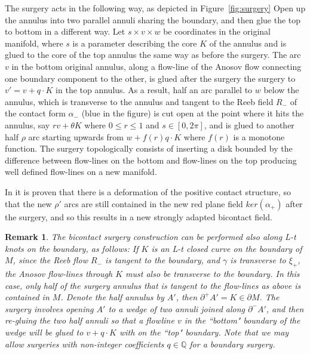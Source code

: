 \documentclass{amsart}
\newtheorem{remark}[theorem]{Remark}
\theoremstyle{definition}
\theoremstyle{remark}
\begin{document}
{
The surgery acts in the following way, as depicted in Figure~\ref{fig:surgery} Open up the annulus into two parallel annuli sharing the boundary, and then glue the top to bottom in a different way. Let $s\times v\times w$ be coordinates in the original manifold, where $s$ is a parameter describing the core $K$ of the annulus and is glued to the core of the top annulus the same way as before the surgery. The arc $v$ in the bottom original annulus, along a flow-line of the Anosov flow connecting one boundary component to the other, is glued after the surgery the surgery to $v'=v+q\cdot K$ in the top annulus. As a result, half an arc parallel to $w$ below the annulus, which is transverse to the annulus and tangent to the Reeb field $R_-$ of the contact form $\alpha_-$ (blue in the figure) is cut open at the point where it hits the annulus, say $rv+\theta K$ where $0\leq r\leq 1$ and $s\in[0,2\pi]$, and is glued to another half $\rho$ arc starting upwards from $w+f(r)q\cdot K$ where $f(r)$ is a monotone function. The surgery topologically consists of inserting a disk bounded by the difference between flow-lines on the bottom and flow-lines on the top producing well defined flow-lines on a new manifold. 

In \cite{Sal1} it is proven that there is a deformation of the positive contact structure, so that the new
$\rho'$ arcs are still contained in the new red plane field $ker(\alpha_+)$ after the surgery, and so this results in a new strongly adapted bicontact field.
}

 

 \begin{remark}
     The bicontact surgery construction can be performed also along L-t knots on the boundary, as follows: If $K$ is an L-t closed curve on the boundary of $M$, since the Reeb flow $R_-$ is tangent to the boundary, and $\gamma$ is transverse to $\xi_+$, the Anosov flow-lines through $K$ must also be transverse to the boundary. In this case, only half of the surgery annulus that is tangent to the flow-lines as above is contained in $M$. Denote the half annulus by $A'$, then $\partial^+A'=K\in\partial M$. The surgery involves opening $A'$ to a wedge of two annuli joined along $\partial^- A'$, and then re-gluing the two half annuli so that a flowline $v$ in the ``bottom" boundary of the wedge will be glued to $v+q\cdot K$ with on the ``top" boundary. Note that we may allow surgeries with non-integer coefficients $q\in \mathbb{Q}$ for a boundary surgery.

 \end{remark}
\end{document}
